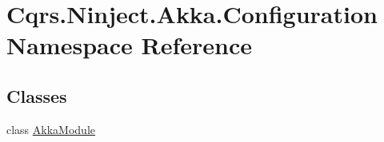 \hypertarget{namespaceCqrs_1_1Ninject_1_1Akka_1_1Configuration}{}\section{Cqrs.\+Ninject.\+Akka.\+Configuration Namespace Reference}
\label{namespaceCqrs_1_1Ninject_1_1Akka_1_1Configuration}
\subsection*{Classes}
\begin{DoxyCompactItemize}
\item 
class \hyperlink{classCqrs_1_1Ninject_1_1Akka_1_1Configuration_1_1AkkaModule}{Akka\+Module}
\end{DoxyCompactItemize}
